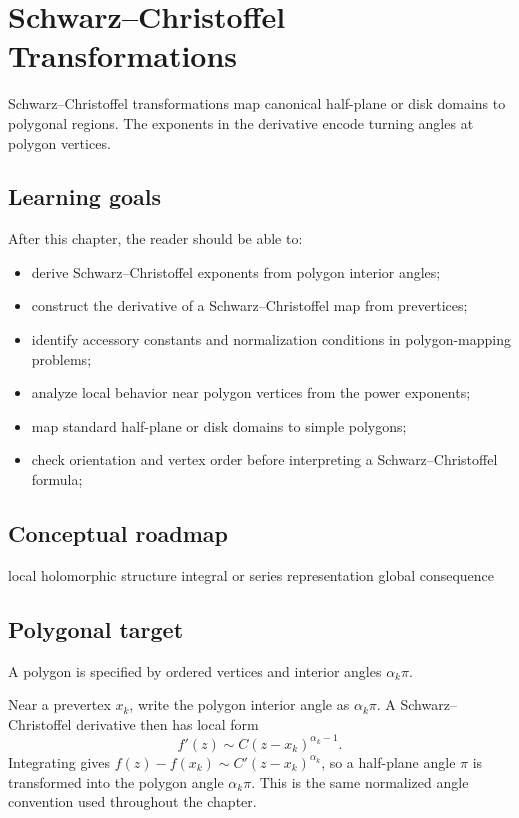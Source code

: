 \chapter{Schwarz–Christoffel Transformations}
\label{ch:iv18}

Schwarz–Christoffel transformations map canonical half-plane or disk domains to polygonal regions. The exponents in the derivative encode turning angles at polygon vertices.

\section*{Learning goals}
After this chapter, the reader should be able to:
\begin{itemize}
\item derive Schwarz--Christoffel exponents from polygon interior angles;
\item construct the derivative of a Schwarz--Christoffel map from prevertices;
\item identify accessory constants and normalization conditions in polygon-mapping problems;
\item analyze local behavior near polygon vertices from the power exponents;
\item map standard half-plane or disk domains to simple polygons;
\item check orientation and vertex order before interpreting a Schwarz--Christoffel formula;
\end{itemize}
\section*{Conceptual roadmap}
\volroadmap
  {local holomorphic structure}
  {integral or series representation}
  {global consequence}

\section{Polygonal target}
A polygon is specified by ordered vertices and interior angles $\alpha_k\pi$.

\begin{example}\label{ex:iv18-expand-01}
Near a prevertex \(x_k\), write the polygon interior angle as \(\alpha_k\pi\). A Schwarz--Christoffel derivative then has local form
\[
f'(z)\sim C(z-x_k)^{\alpha_k-1}.
\]
Integrating gives \(f(z)-f(x_k)\sim C'(z-x_k)^{\alpha_k}\), so a half-plane angle \(\pi\) is transformed into the polygon angle \(\alpha_k\pi\). This is the same normalized angle convention used throughout the chapter.
\end{example}
